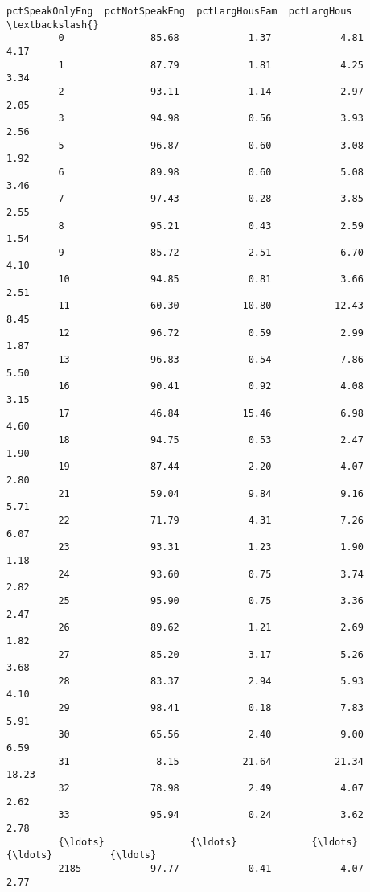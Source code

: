 \documentclass[11pt]{llncs}
\begin{document}
\begin{Verbatim}[commandchars=\\\{\}]
               pctSpeakOnlyEng  pctNotSpeakEng  pctLargHousFam  pctLargHous  \textbackslash{}
         0               85.68            1.37            4.81         4.17   
         1               87.79            1.81            4.25         3.34   
         2               93.11            1.14            2.97         2.05   
         3               94.98            0.56            3.93         2.56   
         5               96.87            0.60            3.08         1.92   
         6               89.98            0.60            5.08         3.46   
         7               97.43            0.28            3.85         2.55   
         8               95.21            0.43            2.59         1.54   
         9               85.72            2.51            6.70         4.10   
         10              94.85            0.81            3.66         2.51   
         11              60.30           10.80           12.43         8.45   
         12              96.72            0.59            2.99         1.87   
         13              96.83            0.54            7.86         5.50   
         16              90.41            0.92            4.08         3.15   
         17              46.84           15.46            6.98         4.60   
         18              94.75            0.53            2.47         1.90   
         19              87.44            2.20            4.07         2.80   
         21              59.04            9.84            9.16         5.71   
         22              71.79            4.31            7.26         6.07   
         23              93.31            1.23            1.90         1.18   
         24              93.60            0.75            3.74         2.82   
         25              95.90            0.75            3.36         2.47   
         26              89.62            1.21            2.69         1.82   
         27              85.20            3.17            5.26         3.68   
         28              83.37            2.94            5.93         4.10   
         29              98.41            0.18            7.83         5.91   
         30              65.56            2.40            9.00         6.59   
         31               8.15           21.64           21.34        18.23   
         32              78.98            2.49            4.07         2.62   
         33              95.94            0.24            3.62         2.78   
         {\ldots}               {\ldots}             {\ldots}             {\ldots}          {\ldots}   
         2185            97.77            0.41            4.07         2.77   

\end{Verbatim}
\end{document}
